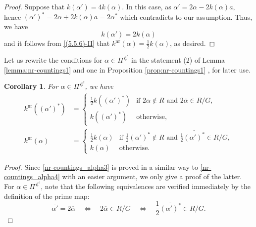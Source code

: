 \documentclass[11pt]{amsart}
\newcommand{\nr}{\mathrm{nr}}
\newcommand{\dc}{\,\underline{\mathrm{d}}^c}
\newtheorem{cor}[thm]{Corollary}%
\begin{document}
{\begin{proof}
Suppose that $k(\alpha')=4k(\alpha)$. In this case, as $\alpha'=2\alpha-2k(\alpha)a$, hence 
$(\alpha')^\ast=2\alpha+2k(\alpha)a=2\alpha^\ast$ which contradicts to our assumption. 
Thus, we have
\begin{equation}\label{nr-countings8}
k(\alpha')=2k(\alpha)
\end{equation} 
and it follows from \eqref{(5.5.6)-II} that 
$k^{\nr}(\alpha) = \frac{1}{2}k(\alpha)$, as desired. 
\end{proof}
\vskip 3mm
Let us rewrite the conditions for $\alpha\in \Pi^{\dc}$ in the statement (2) of 
Lemma \ref{lemma:nr-countings1} and one in Proposition \ref{prop:nr-countings1}
, for later use.
\begin{cor}\label{cor:nr-countings1}
For $\alpha\in \Pi^{\dc}$, we have
\begin{align}
k^{\mathrm{nr}}((\alpha')^\ast)&=
\begin{cases}
\frac12 k((\alpha')^\ast) & \text{if }2\alpha\not\in R\text{ and }
2\overline{\alpha}\in R/G,\\
k((\alpha')^\ast) & \text{otherwise},
\end{cases}\label{nr-countings_alpha3}  
\\
k^{\mathrm{nr}}(\alpha)&=
\begin{cases}
\frac12 k(\alpha) & \text{if }\frac12(\alpha')^\ast\not\in R\text{ and }
\frac12\overline{(\alpha')^\ast}\in R/G,\\
k(\alpha) & \text{otherwise}.
\end{cases}\label{nr-countings_alpha4}
\end{align}
\end{cor}

\begin{proof}
Since \eqref{nr-countings_alpha3} is proved in a similar way to 
\eqref{nr-countings_alpha4} with an easier argument, we only give a proof of
the latter. %
For $\alpha\in\Pi^{\dc}$, note  that the following equivalences 
are verified immediately by the definition of the prime map: 
\begin{equation}\label{nr-countings-cor1}
\overline{\alpha'}=2\overline{\alpha}\quad \Longleftrightarrow\quad 
2\overline{\alpha}\in R/G\quad \Longleftrightarrow\quad 
\frac12 \overline{(\alpha')^\ast}\in R/G.
\end{equation}


\end{proof}}
\end{document}
